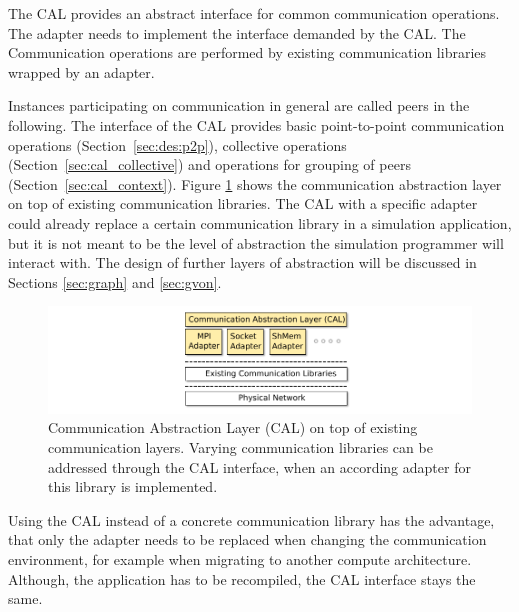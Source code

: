 The CAL provides an abstract interface for common communication
operations. The adapter needs to implement the interface demanded by
the CAL.  The Communication operations are performed by existing
communication libraries wrapped by an adapter.

Instances participating on communication in general are called peers
in the following.  The interface of the CAL provides basic
point-to-point communication operations (Section~\ref{sec:des:p2p}),
collective operations (Section~\ref{sec:cal_collective}) and
operations for grouping of peers (Section~\ref{sec:cal_context}).
Figure \ref{fig:cal} shows the communication abstraction layer on top
of existing communication libraries.  The CAL with a specific adapter
could already replace a certain communication library in a simulation
application, but it is not meant to be the level of abstraction the
simulation programmer will interact with. The design of further layers
of abstraction will be discussed in Sections \ref{sec:graph} and
\ref{sec:gvon}.

\begin{figure}[H]
  \centering
  \includegraphics[width=\textwidth]{graphics/30_design_cal}
  \caption{Communication Abstraction Layer (CAL) on top of existing
    communication layers. Varying communication libraries can be
    addressed through the CAL interface, when an according adapter for
    this library is implemented.}
  \label{fig:cal}
\end{figure}


\noindent Using the CAL instead of a concrete communication library has
the advantage, that only the adapter needs to be replaced when
changing the communication environment, for example when migrating
to another compute architecture. Although, the application has
to be recompiled, the CAL interface stays the same.




